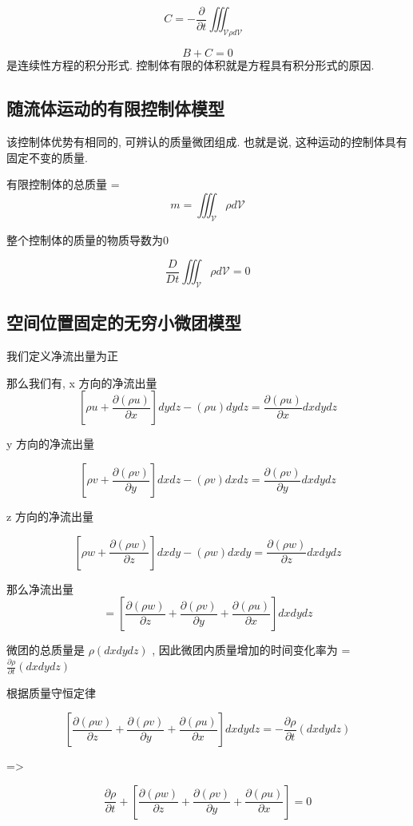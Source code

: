 \documentclass[UTF8]{ctexart}
\begin{document}
$$
	C = - \frac{\partial}{\partial t}\iiint_{\mathcal{V} \rho d \mathcal{V}}
$$

$$
	B + C = 0
$$
是连续性方程的积分形式. 控制体有限的体积就是方程具有积分形式的原因.


\subsection{随流体运动的有限控制体模型}
该控制体优势有相同的, 可辨认的质量微团组成. 也就是说, 这种运动的控制体具有固定不变的质量.

有限控制体的总质量 =
$$
	m = \iiint_{\mathcal{V}} \rho d \mathcal{V}
$$

整个控制体的质量的物质导数为0

$$
	\frac{D}{Dt} \iiint_{\mathcal{V}} \rho d \mathcal{V} = 0
$$

\subsection{空间位置固定的无穷小微团模型}

我们定义净流出量为正

那么我们有, x 方向的净流出量
$$
	[ \rho u + \frac{\partial (\rho u)}{\partial x} ] dy dz - (\rho u) dydz = \frac{\partial (\rho u)}{\partial x} dxdydz
$$

y 方向的净流出量

$$
	[ \rho v + \frac{\partial (\rho v)}{\partial y} ] dx dz - (\rho v) dxdz = \frac{\partial (\rho v)}{\partial y} dxdydz
$$

z 方向的净流出量

$$
	[ \rho w + \frac{\partial (\rho w)}{\partial z} ] dx dy - (\rho w) dxdy = \frac{\partial (\rho w)}{\partial z} dxdydz
$$

那么净流出量 $$=[\frac{\partial (\rho w)}{\partial z} + \frac{\partial (\rho v)}{\partial y} + \frac{\partial (\rho u)}{\partial x} ] dxdydz$$

微团的总质量是 $\rho (dxdydz)$ , 因此微团内质量增加的时间变化率为 = $\frac{\partial \rho}{\partial t} (dxdydz)$


根据质量守恒定律

$$
	[\frac{\partial (\rho w)}{\partial z} + \frac{\partial (\rho v)}{\partial y} + \frac{\partial (\rho u)}{\partial x} ] dxdydz = -\frac{\partial \rho}{\partial t} (dxdydz)
$$

=>

$$
	\frac{\partial \rho}{\partial t}  + [\frac{\partial (\rho w)}{\partial z} + \frac{\partial (\rho v)}{\partial y} + \frac{\partial (\rho u)}{\partial x} ] = 0
$$
\end{document}
